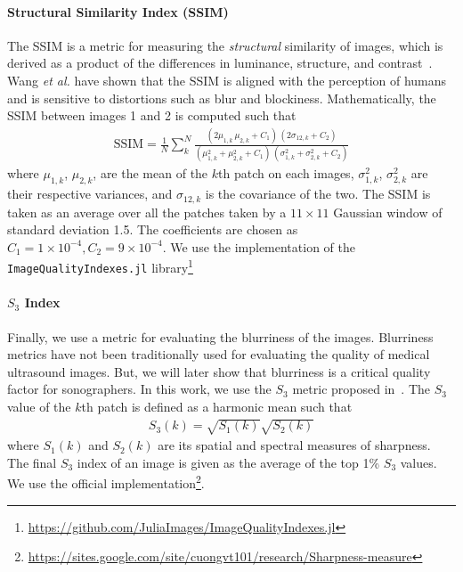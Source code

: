 \paragraph{Structural Similarity Index (SSIM)}
The SSIM is a metric for measuring the \textit{structural} similarity of images, which is derived as a product of the differences in luminance, structure, and contrast~\cite{wang_image_2004a}.
Wang \textit{et al.} have shown that the SSIM is aligned with the perception of humans and is sensitive to distortions such as blur and blockiness.
Mathematically, the SSIM between images 1 and 2 is computed such that
{
\begin{align}
  \mathrm{SSIM} = \frac{1}{N} \sum_k^N \frac{
    (2 \mu_{1,k} \, \mu_{2, k} + C_1)\,(2 \sigma_{12, k} + C_2)
  }{
    (\mu_{1,k}^2 + \mu_{2,k}^2 + C_1)\,( \sigma_{1,k}^2 + \sigma_{2,k}^2 + C_2)
  }
\end{align}
}
{\noindent}where \(\mu_{1,k}\), \(\mu_{2,k}\), are the mean of the \(k\)th patch on each images, \(\sigma_{1,k}^2\), \(\sigma_{2,k}^2\) are their respective variances, and \(\sigma_{12, k}\) is the covariance of the two.
The SSIM is taken as an average over all the patches taken by a \(11 \times 11\) Gaussian window of standard deviation 1.5.
The coefficients are chosen as \(C_1 = 1 \times 10^{-4}, C_2 = 9 \times 10^{-4} \).
We use the implementation of the \texttt{ImageQualityIndexes.jl} library\footnote{\url{https://github.com/JuliaImages/ImageQualityIndexes.jl}}

\paragraph{\(S_3\) Index}
Finally, we use a metric for evaluating the blurriness of the images.
Blurriness metrics have not been traditionally used for evaluating the quality of medical ultrasound images.
But, we will later show that blurriness is a critical quality factor for sonographers.
In this work, we use the \(S_3\) metric proposed in~\cite{vu_bf_2012}.
The \(S_3\) value of the \(k\)th patch is defined as a harmonic mean such that
\begin{align}
  S_3\left(k\right) = \sqrt{S_1\left(k\right)} \sqrt{S_2\left(k\right)}
\end{align}
{\noindent}where \(S_1\left(k\right)\) and \(S_2\left(k\right)\) are its spatial and spectral measures of sharpness.
The final \(S_3\) index of an image is given as the average of the top 1\% \(S_3\) values.
We use the official implementation\footnote{\url{https://sites.google.com/site/cuongvt101/research/Sharpness-measure}}.

